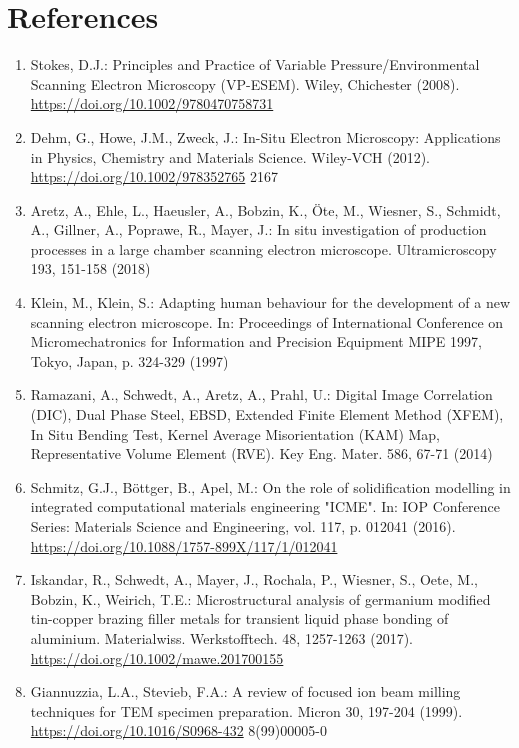 \documentclass[10pt]{article}
\begin{document}
\section*{References}
\begin{enumerate}
  \item Stokes, D.J.: Principles and Practice of Variable Pressure/Environmental Scanning Electron Microscopy (VP-ESEM). Wiley, Chichester (2008). \href{https://doi.org/10.1002/9780470758731}{https://doi.org/10.1002/9780470758731}

  \item Dehm, G., Howe, J.M., Zweck, J.: In-Situ Electron Microscopy: Applications in Physics, Chemistry and Materials Science. Wiley-VCH (2012). \href{https://doi.org/10.1002/978352765}{https://doi.org/10.1002/978352765} 2167

  \item Aretz, A., Ehle, L., Haeusler, A., Bobzin, K., Öte, M., Wiesner, S., Schmidt, A., Gillner, A., Poprawe, R., Mayer, J.: In situ investigation of production processes in a large chamber scanning electron microscope. Ultramicroscopy 193, 151-158 (2018)

  \item Klein, M., Klein, S.: Adapting human behaviour for the development of a new scanning electron microscope. In: Proceedings of International Conference on Micromechatronics for Information and Precision Equipment MIPE 1997, Tokyo, Japan, p. 324-329 (1997)

  \item Ramazani, A., Schwedt, A., Aretz, A., Prahl, U.: Digital Image Correlation (DIC), Dual Phase Steel, EBSD, Extended Finite Element Method (XFEM), In Situ Bending Test, Kernel Average Misorientation (KAM) Map, Representative Volume Element (RVE). Key Eng. Mater. 586, 67-71 (2014)

  \item Schmitz, G.J., Böttger, B., Apel, M.: On the role of solidification modelling in integrated computational materials engineering "ICME". In: IOP Conference Series: Materials Science and Engineering, vol. 117, p. 012041 (2016). \href{https://doi.org/10.1088/1757-899X/117/1/012041}{https://doi.org/10.1088/1757-899X/117/1/012041}

  \item Iskandar, R., Schwedt, A., Mayer, J., Rochala, P., Wiesner, S., Oete, M., Bobzin, K., Weirich, T.E.: Microstructural analysis of germanium modified tin-copper brazing filler metals for transient liquid phase bonding of aluminium. Materialwiss. Werkstofftech. 48, 1257-1263 (2017). \href{https://doi.org/10.1002/mawe.201700155}{https://doi.org/10.1002/mawe.201700155}

  \item Giannuzzia, L.A., Stevieb, F.A.: A review of focused ion beam milling techniques for TEM specimen preparation. Micron 30, 197-204 (1999). \href{https://doi.org/10.1016/S0968-432}{https://doi.org/10.1016/S0968-432} 8(99)00005-0

\end{enumerate}
\end{document}
